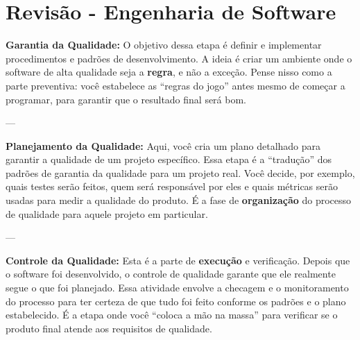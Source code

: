 \documentclass{article}
\begin{document}
\section*{Revisão - Engenharia de Software}

\textbf{Garantia da Qualidade:} O objetivo dessa etapa é definir e implementar procedimentos e padrões de desenvolvimento. A ideia é criar um ambiente onde o software de alta qualidade seja a \textbf{regra}, e não a exceção. Pense nisso como a parte preventiva: você estabelece as ``regras do jogo'' antes mesmo de começar a programar, para garantir que o resultado final será bom.

---

\textbf{Planejamento da Qualidade:} Aqui, você cria um plano detalhado para garantir a qualidade de um projeto específico. Essa etapa é a ``tradução'' dos padrões de garantia da qualidade para um projeto real. Você decide, por exemplo, quais testes serão feitos, quem será responsável por eles e quais métricas serão usadas para medir a qualidade do produto. É a fase de \textbf{organização} do processo de qualidade para aquele projeto em particular.

---

\textbf{Controle da Qualidade:} Esta é a parte de \textbf{execução} e verificação. Depois que o software foi desenvolvido, o controle de qualidade garante que ele realmente segue o que foi planejado. Essa atividade envolve a checagem e o monitoramento do processo para ter certeza de que tudo foi feito conforme os padrões e o plano estabelecido. É a etapa onde você ``coloca a mão na massa'' para verificar se o produto final atende aos requisitos de qualidade.
\end{document}
